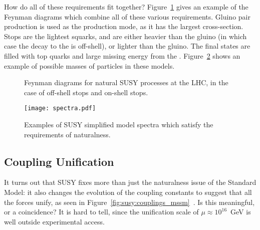 
How do all of these requirements fit together? Figure~\ref{fig:susy:gtt} gives an example of the Feynman diagrams which combine all of these various requirements. Gluino pair production is used as the production mode, as it has the largest cross-section. Stops are the lightest squarks, and are either heavier than the gluino (in which case the decay to the \lsp is off-shell), or lighter than the gluino. The final states are filled with top quarks and large missing energy from the \lsp. Figure~\ref{fig:susy:spectra} shows an example of possible masses of particles in these models.



\begin{figure}
\centering
{}
\label{fig:susy:gtt}
\caption{Feynman diagrams for natural SUSY processes at the LHC, in the case of off-shell stops and on-shell stops.}
\end{figure}




\begin{figure}
\centering
\texttt{[image: spectra.pdf]}
\label{fig:susy:spectra}
\caption{Examples of SUSY simplified model spectra which satisfy the requirements of naturalness.}
\end{figure}





\subsection{Coupling Unification}


It turns out that SUSY fixes more than just the naturalness issue of the Standard Model: it also changes the evolution of the coupling constants to suggest that all the forces unify, as seen in Figure~\ref{fig:susy:couplings_mssm}~\cite{susypheno,SUSYUnification}. Is this meaningful, or a coincidence? It is hard to tell, since the unification scale of $\mu \approx 10^{16}$~GeV is well outside experimental access.

